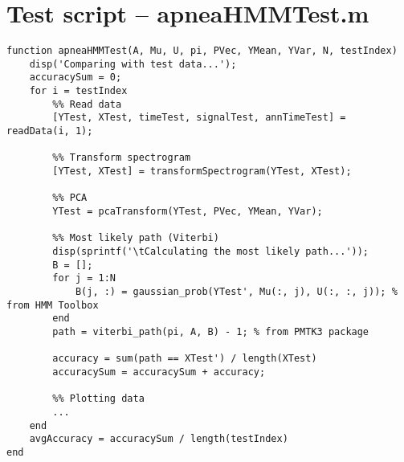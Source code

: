 \section{Test script -- apneaHMMTest.m}
\label{sec:apneaHMMTest}
\begin{lstlisting}
function apneaHMMTest(A, Mu, U, pi, PVec, YMean, YVar, N, testIndex)
    disp('Comparing with test data...');
    accuracySum = 0;
    for i = testIndex
        %% Read data
        [YTest, XTest, timeTest, signalTest, annTimeTest] = readData(i, 1);
        
        %% Transform spectrogram
        [YTest, XTest] = transformSpectrogram(YTest, XTest);
        
        %% PCA
        YTest = pcaTransform(YTest, PVec, YMean, YVar);

        %% Most likely path (Viterbi)
        disp(sprintf('\tCalculating the most likely path...'));
        B = [];
        for j = 1:N
            B(j, :) = gaussian_prob(YTest', Mu(:, j), U(:, :, j)); % from HMM Toolbox
        end
        path = viterbi_path(pi, A, B) - 1; % from PMTK3 package
        
        accuracy = sum(path == XTest') / length(XTest)
        accuracySum = accuracySum + accuracy;
        
        %% Plotting data
        ...
    end
    avgAccuracy = accuracySum / length(testIndex)
end
\end{lstlisting}